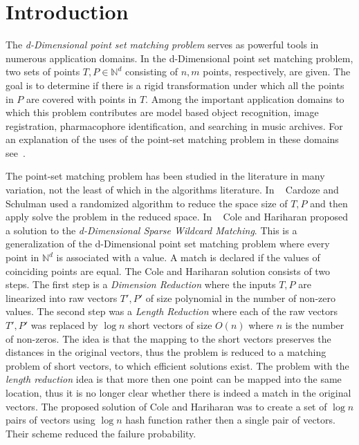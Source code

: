 \documentclass[11pt,amssymb]{article}
\newcommand{\N}{{\mathbb N}}
\begin{document}
\setlength{\parindent}{0.0in}
\setlength{\parskip}{0.1 in}

\section{Introduction\label{sec:intro}}

The {\em  d-Dimensional point set matching problem} serves as powerful
tools in numerous application domains.
In the d-Dimensional point set matching problem, two sets of points
$T,P \in \N^d$ consisting of $n,m$ points, respectively, are given.
The goal is to determine if there is a rigid transformation under
which all the points in $P$ are covered with points in $T$. Among the
important application domains to which this problem contributes are
model based object recognition, image registration, pharmacophore
identification, and searching in music archives. For an explanation of
the uses of the point-set matching problem in these domains
see~\cite{LR07}.

The point-set matching problem has been studied in the literature in
many variation,  not the least of which in the
algorithms literature. In ~\cite{sc:98Sch} Cardoze and Schulman used a
randomized algorithm to reduce the space size of $T,P$ and then
apply solve the problem in the reduced
space. In ~\cite{CH:02} Cole and Hariharan proposed a solution to
the {\it d-Dimensional Sparse Wildcard Matching}. This is a
generalization of the d-Dimensional point set matching problem where
every point in $\N^d$ is associated with a value. A match is declared
if the values of coinciding points are equal. The Cole and Hariharan
solution consists of two steps. The first step is a {\it Dimension
Reduction} where the inputs $T,P$ are linearized into raw vectors
$T',P'$ of size polynomial in the number of non-zero values. The
second step was a {\it Length Reduction} where each of the raw vectors
$T',P'$ was replaced by $\log n$ short vectors of size $O(n)$ where
$n$ is the number of non-zeros. The idea is that the mapping to the
short vectors preserves the distances in the original vectors, thus
the problem is reduced to a matching problem of short vectors, to
which efficient solutions exist. The problem with the {\em length
reduction} idea is that more then one point can be mapped into the
same location, thus it is no longer clear whether there is indeed a
match in the original vectors. The proposed solution of Cole and
Hariharan was to create a set of $\log n$ pairs of vectors using
$\log n$ hash function rather then a single pair of vectors. Their
scheme reduced the failure probability.
\end{document}
